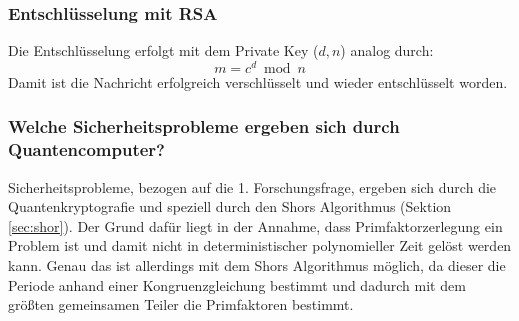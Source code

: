 \subsubsection{Entschlüsselung mit RSA}
Die Entschlüsselung erfolgt mit dem Private Key ($d, n$) analog durch:
\[
m = c^d \bmod n
\]
Damit ist die Nachricht  erfolgreich verschlüsselt und wieder entschlüsselt worden.

\subsubsection{Welche Sicherheitsprobleme ergeben sich durch Quantencomputer?}
Sicherheitsprobleme, bezogen auf die 1. Forschungsfrage, ergeben sich durch die
Quantenkryptografie und speziell durch den Shors Algorithmus (Sektion \ref{sec:shor}).
Der Grund dafür liegt in der Annahme, dass Primfaktorzerlegung ein  Problem ist und
damit nicht in deterministischer polynomieller Zeit gelöst werden kann. 
Genau das ist allerdings mit dem Shors Algorithmus möglich, da dieser die Periode anhand
einer Kongruenzgleichung bestimmt und dadurch mit dem größten gemeinsamen 
Teiler die Primfaktoren bestimmt.

